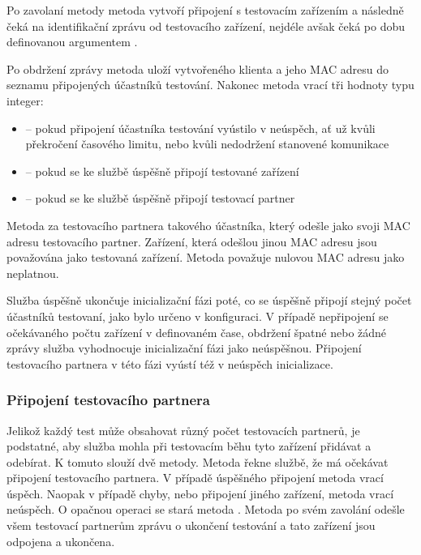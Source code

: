 Po zavolaní metody  metoda vytvoří připojení s testovacím zařízením a následně čeká na identifikační zprávu od testovacího zařízení, nejdéle avšak čeká po dobu definovanou argumentem . 

Po obdržení zprávy metoda uloží vytvořeného klienta a jeho MAC adresu do seznamu připojených účastníků testování. Nakonec metoda vrací tři hodnoty typu integer:
\begin{itemize}
    \item {} -- pokud připojení účastníka testování vyústilo v neúspěch, ať už kvůli překročení časového limitu, nebo kvůli nedodržení stanovené komunikace
    \item {} -- pokud se ke službě úspěšně připojí testované zařízení
    \item {} -- pokud se ke službě úspěšně připojí testovací partner
\end{itemize}

Metoda  za testovacího partnera takového účastníka, který odešle jako svoji MAC adresu testovacího partner. Zařízení, která odešlou jinou MAC adresu jsou považována jako testovaná zařízení. Metoda považuje nulovou MAC adresu jako neplatnou.

Služba úspěšně ukončuje inicializační fázi poté, co se úspěšně připojí stejný počet účastníků testovaní, jako bylo určeno v konfiguraci. V případě nepřipojení se očekávaného počtu zařízení v definovaném čase, obdržení špatné nebo žádné zprávy služba vyhodnocuje inicializační fázi jako neúspěšnou. Připojení testovacího partnera v této fázi vyústí též v neúspěch inicializace. 

\subsubsection{Připojení testovacího partnera}

Jelikož každý test může obsahovat různý počet testovacích partnerů, je podstatné, aby služba mohla při testovacím běhu tyto zařízení přidávat a odebírat. K tomuto slouží dvě metody. Metoda  řekne službě, že má očekávat připojení testovacího partnera. V případě úspěšného připojení metoda vrací úspěch. Naopak v případě chyby, nebo připojení jiného zařízení, metoda vrací neúspěch. O opačnou operaci se stará metoda . Metoda po svém zavolání odešle všem testovací partnerům zprávu o ukončení testování a tato zařízení jsou odpojena a ukončena.

